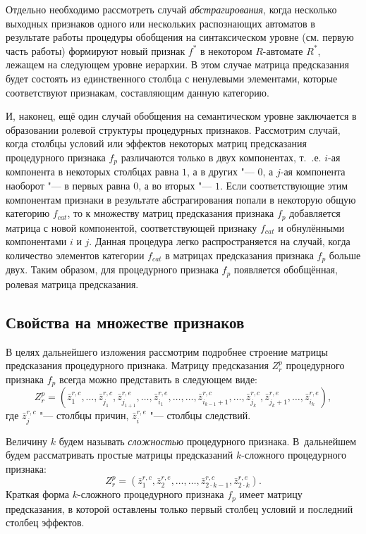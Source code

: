 Отдельно необходимо рассмотреть случай \textit{абстрагирования}, когда несколько выходных признаков одного или нескольких распознающих автоматов в результате работы процедуры обобщения на синтаксическом уровне (см. первую часть работы) формируют новый признак $f^*$ в некотором $R$-автомате $R^*$, лежащем на следующем уровне иерархии. В этом случае матрица предсказания будет состоять из единственного столбца с ненулевыми элементами, которые соответствуют признакам, составляющим данную категорию.

И, наконец, ещё один случай обобщения на семантическом уровне заключается в образовании ролевой структуры процедурных признаков. Рассмотрим случай, когда столбцы условий или эффектов некоторых матриц предсказания процедурного признака $f_p$ различаются только в двух компонентах, т.~.е. $i$-ая компонента в некоторых столбцах равна $1$, а в других "--- $0$, а $j$-ая компонента наоборот "--- в первых равна $0$, а во вторых "--- $1$. Если соответствующие этим компонентам признаки в результате абстрагирования попали в некоторую общую категорию $f_{cat}$, то к множеству матриц предсказания признака $f_p$ добавляется матрица с новой компонентой, соответствующей признаку $f_{cat}$ и обнулёнными компонентами $i$ и $j$. Данная процедура легко распространяется на случай, когда количество элементов категории $f_{cat}$ в матрицах предсказания признака $f_p$ больше двух. Таким образом, для процедурного признака $f_p$ появляется обобщённая, ролевая матрица предсказания.

\subsection{Свойства на множестве признаков}

В целях дальнейшего изложения рассмотрим подробнее строение матрицы предсказания процедурного признака. Матрицу предсказания $Z_r^p$ процедурного признака $f_p$ всегда можно представить в следующем виде:
\begin{equation}
Z_r^p=(\bar z_1^{r,c},\dots,\bar z_{j_1}^{r,c},\bar z_{j_{1+1}}^{r,e},\dots,\bar z_{i_1}^{r,e},\dots,\dots,\bar z_{i_{k-1}+1}^{r,c},\dots,\bar z_{j_k}^{r,c},\bar z_{j_k+1}^{r,e},\dots,\bar z_{i_k}^{r,e}),
\end{equation}
где $\bar z_j^{r,c}$ "--- столбцы причин, $\bar z_i^{r,e}$ "--- столбцы следствий. 

Величину $k$ будем называть \textit{сложностью} процедурного признака. В~дальнейшем будем рассматривать простые матрицы предсказаний $k$-сложного процедурного признака:
\begin{equation}
Z_r^p=(\bar z_1^{r,c},\bar z_2^{r,e},\dots,\dots,\bar z_{2\cdot k-1}^{r,c},\bar z_{2\cdot k}^{r,e}).
\end{equation}
Краткая форма $k$-сложного процедурного признака $f_p$ имеет матрицу предсказания, в которой оставлены только первый столбец условий и последний столбец эффектов.


